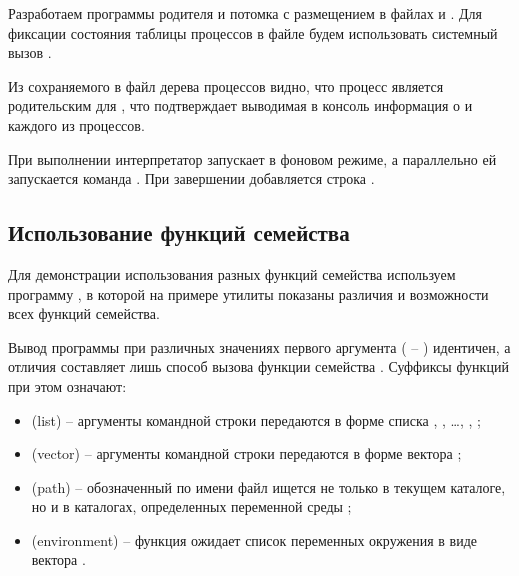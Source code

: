 Разработаем программы родителя и потомка с размещением в файлах  и . Для фиксации состояния таблицы процессов в файле будем использовать системный вызов .







Из сохраняемого в файл  дерева процессов видно, что процесс  является родительским для , что подтверждает выводимая в консоль информация о  и  каждого из процессов.



При выполнении  интерпретатор запускает  в фоновом режиме, а параллельно ей запускается команда . При завершении  добавляется строка .



\subsection{Использование функций семейства }

Для демонстрации использования разных функций семейства используем программу , в которой на примере утилиты  показаны различия и возможности всех функций семейства.



Вывод программы при различных значениях первого аргумента ( -- ) идентичен, а отличия составляет лишь способ вызова функции семейства . Суффиксы функций при этом означают:
\begin{itemize}
	\item {} (list) -- аргументы командной строки передаются в форме списка , , \dots, , ;
	\item {} (vector) -- аргументы командной строки передаются в форме вектора ;
	\item {} (path) -- обозначенный по имени файл ищется не только в текущем каталоге, но и в каталогах, определенных переменной среды ;
	\item {} (environment) -- функция ожидает список переменных окружения в виде вектора .
\end{itemize}

